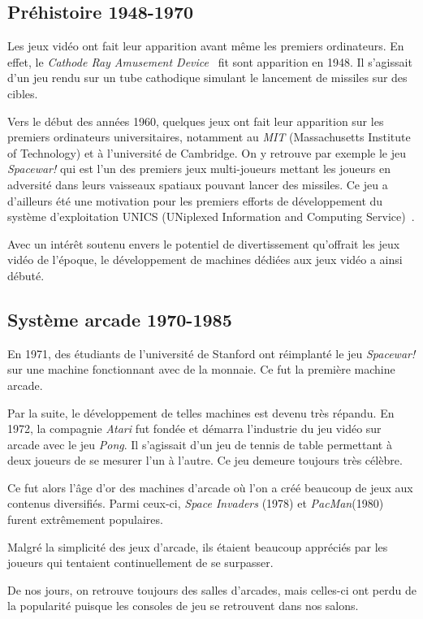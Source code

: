 \documentclass[12pt,twoside,letterpaper,francais]{book}
\newcommand{\si}{{\textit{Space Invaders }}}
\begin{document}
\FloatBarrier
\subsection{Préhistoire 1948-1970}
Les jeux vidéo ont fait leur apparition avant même les premiers
ordinateurs. En effet, le \textit{Cathode Ray Amusement
  Device}~\cite{CRTAD} fit sont apparition en 1948. Il s'agissait d'un
jeu rendu sur un tube cathodique simulant le lancement de missiles sur
des cibles.

Vers le début des années 1960, quelques jeux ont fait leur apparition
sur les premiers ordinateurs universitaires, notamment au \textit{MIT}
(Massachusetts Institute of Technology) et à l'université de
Cambridge. On y retrouve par exemple le jeu \textit{Spacewar!} qui est
l'un des premiers jeux multi-joueurs mettant les joueurs en adversité
dans leurs vaisseaux spatiaux pouvant lancer des missiles. Ce jeu a
d'ailleurs été une motivation pour les premiers efforts de
développement du système d'exploitation UNICS (UNiplexed Information
and Computing Service)~\cite{SPACEWAR-UNICS}.

Avec un intérêt soutenu envers le potentiel de divertissement
qu'offrait les jeux vidéo de l'époque, le développement de machines
dédiées aux jeux vidéo a ainsi débuté.


\FloatBarrier
\subsection{Système arcade 1970-1985}
En 1971, des étudiants de l'université de Stanford ont réimplanté le
jeu \textit{Spacewar!} sur une machine fonctionnant avec de la
monnaie. Ce fut la première machine arcade.

Par la suite, le développement de telles machines est devenu très
répandu. En 1972, la compagnie \textit{Atari} fut fondée et démarra
l'industrie du jeu vidéo sur arcade avec le jeu \textit{Pong}. Il
s'agissait d'un jeu de tennis de table permettant à deux joueurs de se
mesurer l'un à l'autre. Ce jeu demeure toujours très célèbre.

Ce fut alors l'âge d'or des machines d'arcade où l'on a créé beaucoup
de jeux aux contenus diversifiés. Parmi ceux-ci, \si(1978) et
\textit{PacMan}(1980) furent extrêmement populaires.

Malgré la simplicité des jeux d'arcade, ils étaient beaucoup appréciés
par les joueurs qui tentaient continuellement de se surpasser.

De nos jours, on retrouve toujours des salles d'arcades, mais
celles-ci ont perdu de la popularité puisque les consoles de jeu se
retrouvent dans nos salons.
\end{document}
